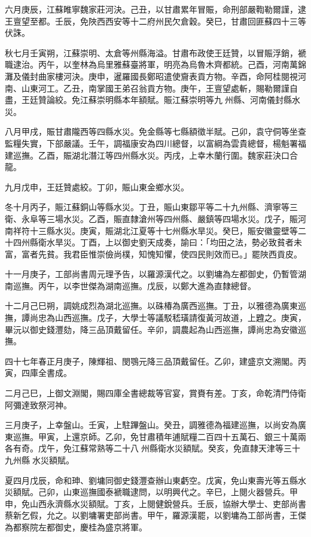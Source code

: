 \begin{pinyinscope}
六月庚辰，江蘇睢寧魏家莊河決。己丑，以甘肅累年冒賑，命刑部嚴鞫勒爾謹，逮王亶望至都。壬辰，免陜西西安等十二府州民欠倉穀。癸巳，甘肅回匪蘇四十三等伏誅。

秋七月壬寅朔，江蘇崇明、太倉等州縣海溢。甘肅布政使王廷贊，以冒賑浮銷，褫職逮治。丙午，以奎林為烏里雅蘇臺將軍，明亮為烏魯木齊都統。己酉，河南萬錦灘及儀封曲家樓河決。庚申，暹羅國長鄭昭遣使齎表貢方物。辛酉，命阿桂閱視河南、山東河工。乙丑，南掌國王弟召翁貢方物。庚午，王亶望處斬，賜勒爾謹自盡，王廷贊論絞。免江蘇崇明縣本年額賦。賑江蘇崇明等九州縣、河南儀封縣水災。

八月甲戌，賑甘肅隴西等四縣水災。免金縣等七縣額徵半賦。己卯，袁守侗等坐查監糧失實，下部嚴議。壬午，調福康安為四川總督，以富綱為雲貴總督，楊魁署福建巡撫。乙酉，賑湖北潛江等四州縣水災。丙戌，上幸木蘭行圍。魏家莊決口合龍。

九月戊申，王廷贊處絞。丁卯，賑山東金鄉水災。

冬十月丙子，賑江蘇銅山等縣水災。丁丑，賑山東鄒平等二十九州縣、濟寧等三衛、永阜等三場水災。乙酉，賑直隸滄州等四州縣、嚴鎮等四場水災。戊子，賑河南祥符十三縣水災。庚寅，賑湖北江夏等十七州縣水旱災。癸巳，賑安徽靈壁等二十四州縣衛水旱災。丁酉，上以御史劉天成奏，諭曰：「均田之法，勢必致貧者未富，富者先貧。我君臣惟崇儉尚樸，知愧知懼，使四民則效而已。」罷陜西貢皮。

十一月庚子，工部尚書周元理予告，以羅源漢代之。以劉墉為左都御史，仍暫管湖南巡撫。丙午，以李世傑為湖南巡撫。戊辰，以鄭大進為直隸總督。

十二月己巳朔，調姚成烈為湖北巡撫。以硃椿為廣西巡撫。丁丑，以雅德為廣東巡撫，譚尚忠為山西巡撫。戊子，大學士等議駁嵇璜請復黃河故道，上韙之。庚寅，畢沅以御史錢灃劾，降三品頂戴留任。辛卯，調農起為山西巡撫，譚尚忠為安徽巡撫。

四十七年春正月庚子，陳輝祖、閔鶚元降三品頂戴留任。乙卯，建盛京文溯閣。丙寅，四庫全書成。

二月己巳，上御文淵閣，賜四庫全書總裁等官宴，賞賚有差。丁亥，命乾清門侍衛阿彌達致祭河神。

三月庚子，上幸盤山。壬寅，上駐蹕盤山。癸丑，調雅德為福建巡撫，以尚安為廣東巡撫。甲寅，上還京師。乙卯，免甘肅積年逋賦糧二百四十五萬石、銀三十萬兩各有奇。戊午，免江蘇常熟等二十八州縣衛水災額賦。癸亥，免直隸天津等三十九州縣水災額賦。

夏四月戊辰，命和珅、劉墉同御史錢灃查辦山東虧空。戊寅，免山東壽光等五縣水災額賦。己卯，山東巡撫國泰褫職逮問，以明興代之。辛巳，上閱火器營兵。甲申，免山西永濟縣水災額賦。丁亥，上閱健銳營兵。壬辰，協辦大學士、吏部尚書蔡新乞假，允之。以劉墉署吏部尚書。甲午，羅源漢罷，以劉墉為工部尚書，王傑為都察院左都御史，慶桂為盛京將軍。


\end{pinyinscope}
